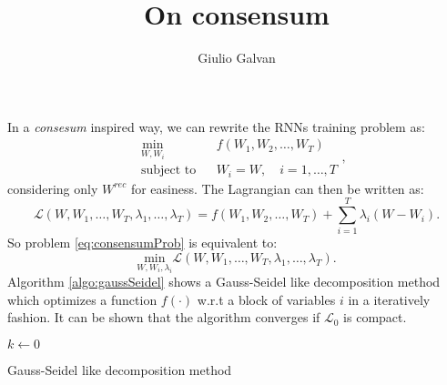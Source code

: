 \documentclass{article}
\title{On consensum}
\author{Giulio Galvan}
\begin{document}
	\maketitle
	
\noindent	
In a \textit{consesum} inspired way, we can rewrite the RNNs training problem as:
\begin{equation}
	\begin{aligned}
		& \underset{W,W_i}{\text{min}}
		& & f(W_1,W_2, \ldots, W_T) \\
		& \text{subject to}
		& & W_i = W,\quad i=1,\ldots,T
	\end{aligned},
	\label{eq:consensumProb}
\end{equation}
considering only $W^{rec}$ for easiness. 
The Lagrangian can then be written as:
\begin{equation}
\mathcal{L}(W,W_1,\ldots, W_T, \lambda_1,\ldots, \lambda_T) = f(W_1,W_2,\ldots,W_T) + \sum_{i=1}^{T}\lambda_i (W-W_i).
\end{equation}
So problem \ref{eq:consensumProb} is equivalent to:
\begin{equation}
\underset{W,W_i,\lambda_i}{\text{min}}\mathcal{L}(W,W_1,\ldots, W_T, \lambda_1,\ldots, \lambda_T).
\label{eq:lagrangianConsensum}
\end{equation}
Algorithm \ref{algo:gaussSeidel} shows a Gauss-Seidel like decomposition method which optimizes a function $f(\cdot)$ w.r.t a block of variables $i$ in a iteratively fashion. It can be shown that the algorithm converges if $\mathcal{L}_0$ is compact.

\begin{algorithm}[!h]
	$k \gets 0$\\
	\caption{Gauss-Seidel like decomposition method}
	\label{algo:gaussSeidel}
\end{algorithm}
\end{document}
